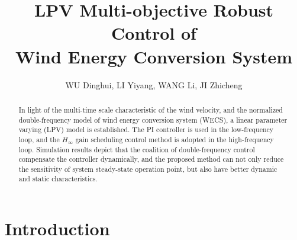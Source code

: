 \documentclass[english]{cccconf}
\begin{document}
\title{LPV Multi-objective Robust Control of \\ Wind Energy Conversion System}
\author{WU Dinghui,
        LI Yiyang,
        WANG Li,
        JI Zhicheng}


\maketitle

\begin{abstract}
In light of the multi-time scale characteristic of the wind velocity,
and the normalized double-frequency model of wind energy conversion system
(WECS), a linear parameter varying (LPV)
model is established. The PI controller is used in the
low-frequency loop, and the $H_\infty$ gain scheduling control
method is
adopted in the high-frequency loop. Simulation results depict that
the coalition of double-frequency control compensate the controller
dynamically, and the proposed method can not only reduce the sensitivity
of system steady-state operation point, but also have better dynamic and
static characteristics.
\end{abstract}




\section{Introduction}
\end{document}
